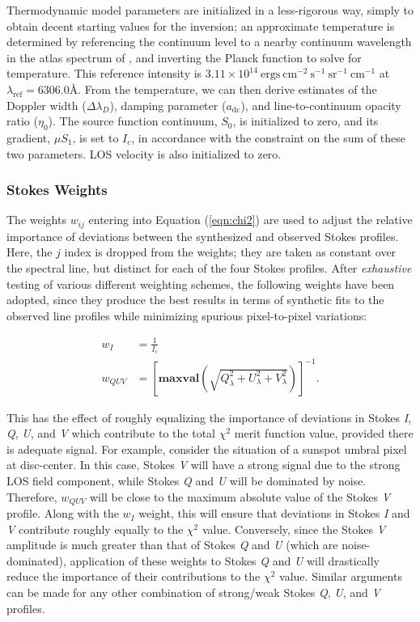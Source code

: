 \documentclass[11pt]{article}
\begin{document}
Thermodynamic model parameters are initialized in a less-rigorous way, simply to obtain decent
starting values for the inversion; an approximate temperature is determined by referencing the 
continuum level to a nearby continuum wavelength in the atlas spectrum of \citet{labs:1968},
and inverting the Planck function to solve for temperature.  This reference intensity is
$3.11 \times 10^{14}\ \mathrm{ergs\ cm^{-2}\ s^{-1}\ sr^{-1}\ cm^{-1}}$ at $\lambda_{\mathrm{ref}} = 6306.0$\AA.
From the temperature, we can then derive estimates of the Doppler width ($\Delta\lambda_{D}$),
damping parameter ($a_{\mathrm{dc}}$), and line-to-continuum opacity ratio ($\eta_{0}$).  The source
function continuum, $S_{0}$, is initialized to zero, and its gradient, $\mu S_{1}$, is set to $I_{c}$,
in accordance with the constraint on the sum of these two parameters.  LOS velocity is also initialized
to zero.



\subsubsection{Stokes Weights}\label{ss:weights}
The weights $w_{ij}$ entering into Equation (\ref{eqn:chi2}) are used to adjust the relative
importance of deviations between the synthesized and observed Stokes profiles.  Here, the
$j$ index is dropped from the weights; they are taken as constant over the spectral line,
but distinct for each of the four Stokes profiles.  After \textit{exhaustive} testing of various
different weighting schemes, the following weights have been adopted, since they produce the best
results in terms of synthetic fits to the observed line profiles while minimizing spurious
pixel-to-pixel variations:

\begin{align}
w_{I} &= \frac{1}{I_c}\\
w_{QUV} &= \left[\mathrm{\mathbf{maxval}}\left(\sqrt{Q_{\lambda}^{2}+U_{\lambda}^{2}+V_{\lambda}^{2}}\right)\right]^{-1}.
\end{align}

This has the effect of roughly equalizing the importance of deviations in Stokes \textit{I},
\textit{Q}, \textit{U}, and \textit{V} which contribute to the total $\chi^{2}$ merit function
value, provided there is adequate signal.  For example, consider the situation of a sunspot umbral
pixel at disc-center.  In this case, Stokes \textit{V} will have a strong signal due to the strong 
LOS field component, while Stokes \textit{Q} and \textit{U} will be dominated by noise.  Therefore,
$w_{QUV}$ will be close to the maximum absolute value of the Stokes \textit{V} profile.  Along with
the $w_{I}$ weight, this will ensure that deviations in Stokes \textit{I} and \textit{V} contribute
roughly equally to the $\chi^{2}$ value.  Conversely, since the Stokes \textit{V} amplitude is much
greater than that of Stokes \textit{Q} and \textit{U} (which are noise-dominated), application of
these weights to Stokes \textit{Q} and \textit{U} will drastically reduce the importance of their
contributions to the $\chi^{2}$ value.  Similar arguments can be made for any other combination of
strong/weak Stokes \textit{Q}, \textit{U}, and \textit{V} profiles.\\
\end{document}
